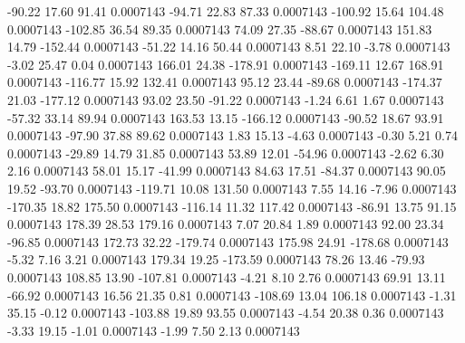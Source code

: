       -90.22       17.60       91.41     0.0007143
      -94.71       22.83       87.33     0.0007143
     -100.92       15.64      104.48     0.0007143
     -102.85       36.54       89.35     0.0007143
       74.09       27.35      -88.67     0.0007143
      151.83       14.79     -152.44     0.0007143
      -51.22       14.16       50.44     0.0007143
        8.51       22.10       -3.78     0.0007143
       -3.02       25.47        0.04     0.0007143
      166.01       24.38     -178.91     0.0007143
     -169.11       12.67      168.91     0.0007143
     -116.77       15.92      132.41     0.0007143
       95.12       23.44      -89.68     0.0007143
     -174.37       21.03     -177.12     0.0007143
       93.02       23.50      -91.22     0.0007143
       -1.24        6.61        1.67     0.0007143
      -57.32       33.14       89.94     0.0007143
      163.53       13.15     -166.12     0.0007143
      -90.52       18.67       93.91     0.0007143
      -97.90       37.88       89.62     0.0007143
        1.83       15.13       -4.63     0.0007143
       -0.30        5.21        0.74     0.0007143
      -29.89       14.79       31.85     0.0007143
       53.89       12.01      -54.96     0.0007143
       -2.62        6.30        2.16     0.0007143
       58.01       15.17      -41.99     0.0007143
       84.63       17.51      -84.37     0.0007143
       90.05       19.52      -93.70     0.0007143
     -119.71       10.08      131.50     0.0007143
        7.55       14.16       -7.96     0.0007143
     -170.35       18.82      175.50     0.0007143
     -116.14       11.32      117.42     0.0007143
      -86.91       13.75       91.15     0.0007143
      178.39       28.53      179.16     0.0007143
        7.07       20.84        1.89     0.0007143
       92.00       23.34      -96.85     0.0007143
      172.73       32.22     -179.74     0.0007143
      175.98       24.91     -178.68     0.0007143
       -5.32        7.16        3.21     0.0007143
      179.34       19.25     -173.59     0.0007143
       78.26       13.46      -79.93     0.0007143
      108.85       13.90     -107.81     0.0007143
       -4.21        8.10        2.76     0.0007143
       69.91       13.11      -66.92     0.0007143
       16.56       21.35        0.81     0.0007143
     -108.69       13.04      106.18     0.0007143
       -1.31       35.15       -0.12     0.0007143
     -103.88       19.89       93.55     0.0007143
       -4.54       20.38        0.36     0.0007143
       -3.33       19.15       -1.01     0.0007143
       -1.99        7.50        2.13     0.0007143
